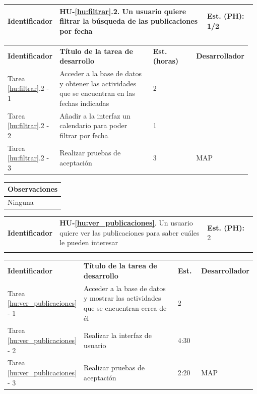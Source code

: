 \documentclass[11pt]{article}
\begin{document}
\centering
\begin{longtable}{p{0.18\linewidth}|p{0.6\linewidth}|p{0.2\linewidth}}
	\toprule
	\toprule
	\textbf{Identificador} & \textbf{HU-\ref{hu:filtrar}.2}. Un usuario quiere filtrar la búsqueda de las publicaciones por fecha & \textbf{Est. (PH):} 1/2 \\
	
	\bottomrule
\end{longtable}

\begin{longtable}{p{0.18\linewidth}|p{0.4\linewidth}|p{0.18\linewidth}|p{0.2\linewidth}}
	\toprule
	\textbf{Identificador} & \textbf{Título de la tarea de desarrollo} & \textbf{Est. (horas)} & \textbf{Desarrollador} \\
        Tarea \ref{hu:filtrar}.2 - 1 & Acceder a la base de datos y obtener las actividades que se encuentran en las fechas indicadas & 2 & \\
        Tarea \ref{hu:filtrar}.2 - 2 & Añadir a la interfaz un calendario para poder filtrar por fecha & 1 & \\
        Tarea \ref{hu:filtrar}.2 - 3 & Realizar pruebas de aceptación & 3 & MAP\\
	\bottomrule
\end{longtable}

\begin{longtable}{p{1.028\linewidth}}
	\textbf{Observaciones}\\
	\midrule
	Ninguna\\
	\bottomrule
	\bottomrule
\end{longtable}

\centering
\begin{longtable}{p{0.18\linewidth}|p{0.6\linewidth}|p{0.2\linewidth}}
	\toprule
	\toprule
	\textbf{Identificador} & \textbf{HU-\ref{hu:ver_publicaciones}}. Un usuario quiere ver las publicaciones para saber cuáles le pueden interesar & \textbf{Est. (PH):} 2\\ \\
	
	\bottomrule
\end{longtable}

\begin{longtable}{p{0.18\linewidth}|p{0.5\linewidth}|p{0.1\linewidth}|p{0.2\linewidth}}
	\toprule
	\textbf{Identificador} & \textbf{Título de la tarea de desarrollo} & \textbf{Est.} & \textbf{Desarrollador} \\
        Tarea \ref{hu:ver_publicaciones} - 1 & Acceder  a la base de datos y mostrar las actividades que se encuentran cerca de él & 2 & \\
        Tarea \ref{hu:ver_publicaciones} - 2 & Realizar la interfaz de usuario & 4:30 & \\
        Tarea \ref{hu:ver_publicaciones} - 3 & Realizar pruebas de aceptación & 2:20 & MAP\\
	\bottomrule
\end{longtable}
\end{document}
